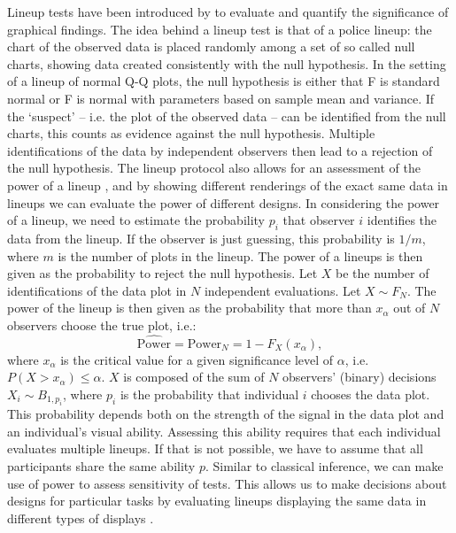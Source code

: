 \documentclass{article}\usepackage[]{graphicx}\usepackage[]{color}
\begin{document}
Lineup tests have been introduced by \citet{buja:2009hp} to evaluate and quantify the significance of graphical findings. The idea behind a lineup test is that of a police lineup: the chart of the observed data is placed randomly among a set of so called null charts, showing data created consistently with the null hypothesis. In the setting of a lineup of normal Q-Q plots, the null hypothesis  is either that F is standard normal or F is normal with parameters based on sample mean and variance.
If the `suspect' -- i.e. the plot of the observed data -- can be identified from the null charts, this counts as evidence against the null hypothesis. Multiple identifications of the data by independent observers then lead to a rejection of the null hypothesis. 
The lineup protocol also allows for an assessment of the power of a lineup \citep{mahbub:2013},  
and by showing different renderings of the exact same data in lineups we can evaluate the power  of different designs.
In considering the power of a lineup, we need to estimate the probability $p_i$ that observer $i$ identifies the data from the lineup. If the observer is just guessing, this probability is $1/m$, where $m$ is the number of plots in the lineup.
The power of a lineups is then given as the probability to reject the null hypothesis. Let $X$ be the number of identifications of the data plot in $N$ independent evaluations. Let $X \sim F_N$. The power of the lineup is then given as the probability that more than $x_\alpha$ out of $N$ observers
choose the true plot, i.e.:
\begin{equation}\label{eqn:power}
\widehat{\text{Power}} = \text{Power}_{N} = 1 - F_{X} (x_{\alpha}),
\end{equation}
where $x_\alpha$ is the critical value for a given significance level of $\alpha$, i.e.~$P(X >  x_{\alpha}) \le \alpha$. $X$ is composed of the sum of $N$ observers' (binary) decisions $X_i \sim B_{1, p_i}$, where  $p_i$ is the probability that individual $i$ chooses the data plot. This probability  depends both on the strength of the signal in the data plot and an individual's visual ability.
Assessing this ability requires that each individual evaluates multiple lineups. 
If that is not possible, we have to assume that all participants share the same ability $p$. %
Similar to classical inference, we can make use of power to assess sensitivity of tests. This allows us to make decisions about designs for particular tasks by evaluating lineups displaying  the same data in different types of displays \citep{Hofmann:2012ts}. 
\end{document}
